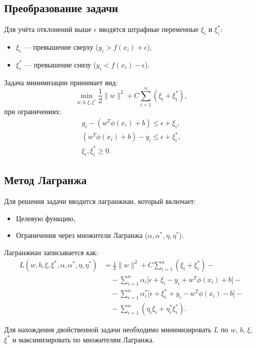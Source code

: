 \subsection{Преобразование задачи}
\par Для учёта отклонений выше \(\epsilon\) вводятся штрафные переменные \(\xi_i\) и \(\xi_i^*\):
\begin{itemize}
    \item \(\xi_i\) — превышение сверху (\(y_i > f(x_i) + \epsilon\)),
    \item \(\xi_i^*\) — превышение снизу (\(y_i < f(x_i) - \epsilon\)).
\end{itemize}
\par Задача минимизации принимает вид:
\begin{equation*}
    \min_{w, b, \xi, \xi^*} \frac{1}{2} \|w\|^2 + C \sum_{i=1}^n (\xi_i + \xi_i^*),
\end{equation*}
при ограничениях:
\begin{equation*}
    \begin{aligned}
        y_i - (w^T \phi(x_i) + b) \leq \epsilon + \xi_i,   \\
        (w^T \phi(x_i) + b) - y_i \leq \epsilon + \xi_i^*, \\
        \xi_i, \xi_i^* \geq 0.
    \end{aligned}
\end{equation*}

\subsection{Метод Лагранжа}
\par Для решения задачи вводится лагранжиан, который включает:
\begin{itemize}
    \item Целевую функцию,
    \item Ограничения через множители Лагранжа (\(\alpha, \alpha^*, \eta, \eta^*\)).
\end{itemize}
\par Лагранжиан записывается как:
\begin{equation*}
    \begin{aligned}
        L(w, b, \xi, \xi^*, \alpha, \alpha^*, \eta, \eta^*) & = \frac{1}{2} \|w\|^2 + C \sum_{i=1}^n (\xi_i + \xi_i^*) -                                 \\
                                                            & \quad - \sum_{i=1}^n \alpha_i \big[ \epsilon + \xi_i - y_i + w^T \phi(x_i) + b \big] -     \\
                                                            & \quad - \sum_{i=1}^n \alpha_i^* \big[ \epsilon + \xi_i^* + y_i - w^T \phi(x_i) - b \big] - \\
                                                            & \quad - \sum_{i=1}^n (\eta_i \xi_i + \eta_i^* \xi_i^*).
    \end{aligned}
\end{equation*}
\par Для нахождения двойственной задачи необходимо минимизировать \(L\) по \(w\), \(b\), \(\xi\), \(\xi^*\) и максимизировать по множителям Лагранжа.

